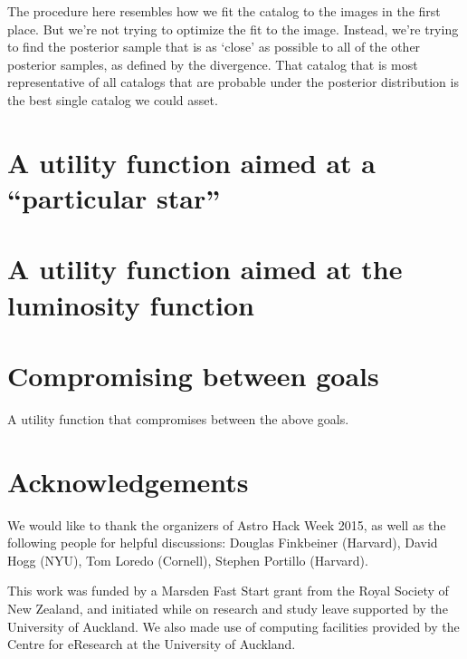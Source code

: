 \documentclass[a4paper,fleqn,usenatbib]{mnras}
\begin{document}
The procedure here resembles how we fit the catalog to the images in the
first place. But we're not trying to optimize the fit to the image. Instead,
we're trying to find the posterior sample that is as `close' as possible to
all of the other posterior samples, as defined by the divergence. That catalog
that is most representative of all catalogs that are probable under the
posterior distribution is the best single catalog we could asset.

\section{A utility function aimed at a ``particular star''}


\section{A utility function aimed at the luminosity function}


\section{Compromising between goals}
A utility function that compromises between the above goals.



\section*{Acknowledgements}
We would like to thank the organizers of Astro Hack Week 2015, as well
as the following people for helpful discussions:
Douglas Finkbeiner (Harvard), David Hogg (NYU), Tom Loredo (Cornell),
Stephen Portillo (Harvard).

This work was funded by a Marsden Fast Start grant from the Royal Society of
New Zealand, and initiated while on research and study leave supported by
the University of Auckland. We also made use of computing facilities provided
by the Centre for eResearch at the University of Auckland.







\end{document}
